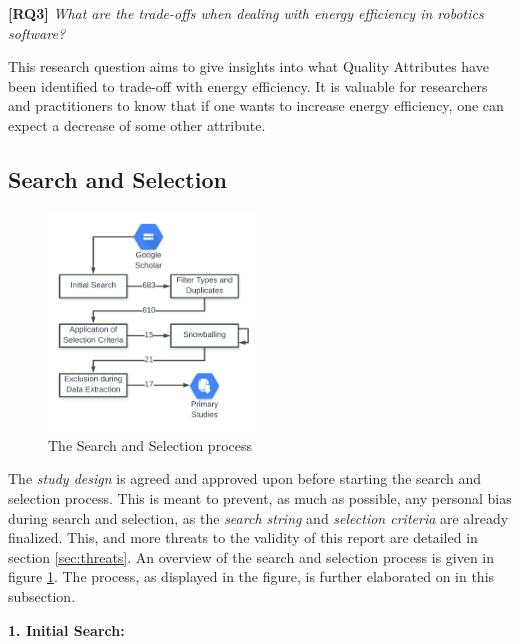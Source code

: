 \vspace{5mm}

\textbf{[RQ3]} \textit{What are the trade-offs when dealing with energy efficiency in robotics software?}

\vspace{5mm}

This research question aims to give insights into what Quality Attributes have been identified to trade-off with energy efficiency. 
It is valuable for researchers and practitioners to know that if one wants to increase energy efficiency, one can expect a decrease of some other attribute.

\subsection{Search and Selection}
\label{sec:study_design:search_selection}
\begin{figure}
    \centering
    \includegraphics[width=0.5\textwidth]{figures/selection_process_var2.png}
    \caption{The Search and Selection process}
    \label{fig:search_selec_process}
\end{figure}

The \textit{study design} is agreed and approved upon before starting the search and selection process. 
This is meant to prevent, as much as possible, any personal bias during search and selection, as the \textit{search string} and \textit{selection criteria} are already finalized.
This, and more threats to the validity of this report are detailed in section \ref{sec:threats}.
An overview of the search and selection process is given in figure \ref{fig:search_selec_process}.
The process, as displayed in the figure, is further elaborated on in this subsection.

\vspace{5mm}

\noindent\textbf{1. Initial Search:}

